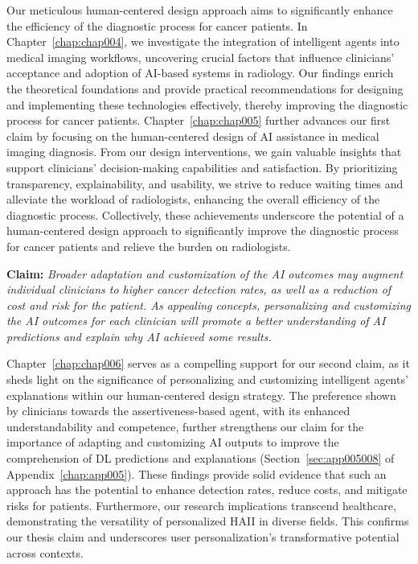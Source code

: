 Our meticulous human-centered design approach aims to significantly enhance the efficiency of the diagnostic process for cancer patients.
In Chapter~\ref{chap:chap004}, we investigate the integration of intelligent agents into medical imaging workflows, uncovering crucial factors that influence clinicians' acceptance and adoption of \ac{AI}-based systems in radiology.
Our findings enrich the theoretical foundations and provide practical recommendations for designing and implementing these technologies effectively, thereby improving the diagnostic process for cancer patients.
Chapter~\ref{chap:chap005} further advances our first claim by focusing on the human-centered design of \ac{AI} assistance in medical imaging diagnosis.
From our design interventions, we gain valuable insights that support clinicians' decision-making capabilities and satisfaction.
By prioritizing transparency, explainability, and usability, we strive to reduce waiting times and alleviate the workload of radiologists, enhancing the overall efficiency of the diagnostic process.
Collectively, these achievements underscore the potential of a human-centered design approach to significantly improve the diagnostic process for cancer patients and relieve the burden on radiologists.

\begin{displayquote}
{\bf Claim:}
{\it
Broader adaptation and customization of the \ac{AI} outcomes may augment individual clinicians to higher cancer detection rates, as well as a reduction of cost and risk for the patient.
As appealing concepts, personalizing and customizing the \ac{AI} outcomes for each clinician will promote a better understanding of \ac{AI} predictions and explain why \ac{AI} achieved some results.
}
\end{displayquote}

\vspace{1.00mm}

Chapter~\ref{chap:chap006} serves as a compelling support for our second claim, as it sheds light on the significance of personalizing and customizing intelligent agents' explanations within our human-centered design strategy.
The preference shown by clinicians towards the assertiveness-based agent, with its enhanced understandability and competence, further strengthens our claim for the importance of adapting and customizing \ac{AI} outputs to improve the comprehension of \ac{DL} predictions and explanations (Section~\ref{sec:app005008} of Appendix~\ref{chap:app005}).
These findings provide solid evidence that such an approach has the potential to enhance detection rates, reduce costs, and mitigate risks for patients.
Furthermore, our research implications transcend healthcare, demonstrating the versatility of personalized \ac{HAII} in diverse fields.
This confirms our thesis claim and underscores user personalization's transformative potential across contexts.

